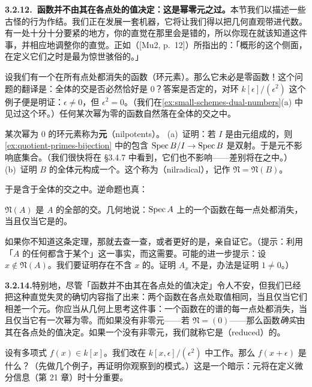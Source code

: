 \textbf{3.2.12.\ 函数并不由其在各点处的值决定：这是幂零元之过。}\quad 本节我们以描述一些古怪的行为作结。我们正在发展一套机器，它将让我们得以把几何直观带进代数。有一处十分十分要紧的地方，你的直觉在那里会是错的，所以你现在就该知道这件事，并相应地调整你的直觉。正如\trMumford{}（[Mu2, p.~12]）所指出的：「概形的这个侧面，在\trGrothendieck{}定义它们之时是最为惊世骇俗的。」

设我们有一个在所有点处都消失的函数（环元素）。那么它未必是零函数！这个问题的翻译是：全体\trPrimeIdeal{}的交是否必然恰好是 $0$？答案是否定的，对\trDualNumbers{}环 $k[\epsilon]/(\epsilon^2)$ 这个例子便是明证：$\epsilon\neq0$，但 $\epsilon^2=0$。（我们在\cref{ex:small-schemes-dual-numbers}(a) 中见过这个环。）任何某次幂为零的函数自然落在全体\trPrimeIdeal{}的交之中。

\begin{exercise}\label{ex:nilpotents-and-nilradical}
某次幂为 $0$ 的环元素称为\textbf{\trNilpotent{}元}（nilpotents）。
(a)~证明：若 $I$ 是由\trNilpotent{}元组成的\trIdeal，则 \cref{ex:quotient-primes-bijection} 中的包含 $\operatorname{Spec} B/I\to\operatorname{Spec} B$ 是双射。于是\trNilpotent{}元不影响底集合。（我们很快将在 \S3.4.7 中看到，它们也不影响\trTopology——差别将在\trStructureSheaf{}之中。）
(b)~证明\trRing{} $B$ 的全体\trNilpotent{}元构成一个\trIdeal。这个\trIdeal{}称为\textbf{\trNilradical}（nilradical），记作 $\mathfrak{N}=\mathfrak{N}(B)$。
\end{exercise}

于是\trNilradical{}含于全体\trPrimeIdeal{}的交之中。逆命题也真：

\begin{theorem}\label{thm:nilradical-intersection-primes}
\trNilradical{} $\mathfrak{N}(A)$ 是 $A$ 的全部\trPrimeIdeal{}的交。几何地说：$\operatorname{Spec} A$ 上的一个函数在每一点处都消失，当且仅当它是\trNilpotent{}的。
\end{theorem}

\begin{exercise}\label{ex:nilradical-theorem-proof}
如果你不知道这条定理，那就去查一查，或者更好的是，亲自证它。（提示：利用「$A$ 的任何\trProperIdeal{}都含于某个\trMaximalIdeal」这一事实，而这需要\trZornsLemma。可能的进一步提示：设 $x\notin\mathfrak{N}(A)$。我们要证明存在不含 $x$ 的\trPrimeIdeal。证明 $A_x$ 不是\trZeroRing，办法是证明 $1\neq0$。）
\end{exercise}

\textbf{3.2.14.}\quad 特别地，尽管「函数并不由其在各点处的值决定」令人不安，但我们已经把这种直觉失灵的确切内容指了出来：两个函数在各点处取值相同，当且仅当它们相差一个\trNilpotent{}元。你应当从几何上思考这件事：一个函数在\trRing{}的谱的每一点处都消失，当且仅当它有一次幂为零。而如果没有非零\trNilpotent{}元——若 $\mathfrak{N}=(0)$——那么函数\emph{确实}由其在各点处的值决定。如果一个\trRing{}没有非零\trNilpotent{}元，我们就称它是\textbf{\trReduced}（reduced）的。

\begin{exercise}\label{ex:derivatives-dual-numbers}
设有多项式 $f(x)\in k[x]$。我们改在 $k[x,\epsilon]/(\epsilon^2)$ 中工作。那么 $f(x+\epsilon)$ 是什么？（先做几个例子，再证明你观察到的模式。）这是一个暗示：\trNilpotent{}元将在定义微分信息（第 21 章）时十分重要。
\end{exercise}
